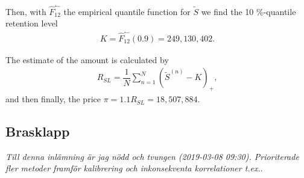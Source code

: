 \documentclass[11pt]{article}
\begin{document}
Then, with $\hat{F}_{12}^\leftharpoonup$ the empirical quantile function for $\tilde{S}$ we find the 10 \%-quantile retention level
\begin{align*} 
	K = \hat{F}_{12}^\leftharpoonup(0.9) = 249,130,402.
\end{align*}

The estimate of the amount  is calculated by
\begin{align} \label{eqsl1}
	R_{SL} = \dfrac{1}{N}\sum_{n=1}^N\left(	 \tilde{S}^{(n)}-K\right)_+ ,    
\end{align}
and then finally, the price $\pi = 1.1R_{SL} = 18,507,884$.

\subsection*{Brasklapp}
{\it Till denna inlämning är jag nödd och tvungen (2019-03-08 09:30). Prioriterade fler metoder framför kalibrering och inkonsekventa korrelationer t.ex.}.
\end{document}
